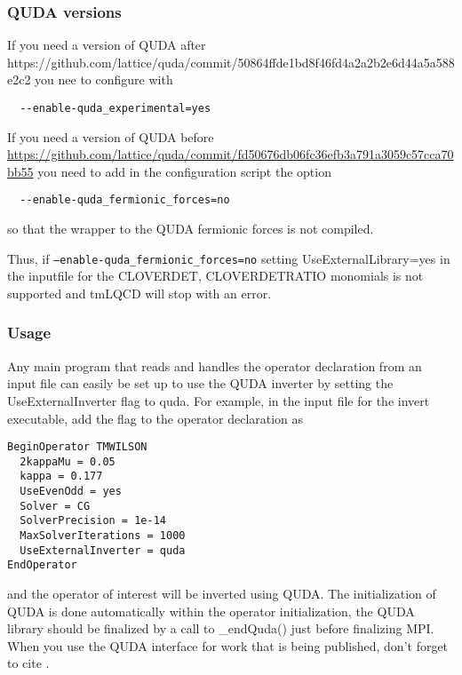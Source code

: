 \subsubsection{QUDA versions}

If you need a version of QUDA after https://github.com/lattice/quda/commit/50864ffde1bd8f46fd4a2a2b2e6d44a5a588e2c2 you nee to configure with 
\begin{verbatim}
  --enable-quda_experimental=yes
\end{verbatim}

If you need a version of QUDA before \url{https://github.com/lattice/quda/commit/fd50676db06fc36efb3a791a3059c57cca70bb55} you need to add in the configuration script the option
\begin{verbatim}
  --enable-quda_fermionic_forces=no
\end{verbatim}
so that the wrapper to the QUDA fermionic forces is not compiled.

Thus, if \texttt{--enable-quda\_fermionic\_forces=no} setting {\ttfamily UseExternalLibrary=yes} in the inputfile for the {\ttfamily  CLOVERDET, CLOVERDETRATIO} monomials
is not supported and tmLQCD will stop with an error.


\subsubsection{Usage}
Any main program that reads and handles the operator declaration from an input file can easily be set up to use the QUDA inverter by setting the {\ttfamily UseExternalInverter} flag to {\ttfamily quda}. For example, in the input file for the {\ttfamily invert} executable, add the flag to the operator declaration as
\begin{verbatim}
BeginOperator TMWILSON
  2kappaMu = 0.05
  kappa = 0.177
  UseEvenOdd = yes
  Solver = CG
  SolverPrecision = 1e-14
  MaxSolverIterations = 1000
  UseExternalInverter = quda
EndOperator
\end{verbatim}
and the operator of interest will be inverted using QUDA. The initialization of QUDA is done automatically within the operator initialization,  the QUDA library should be finalized by a call to {\ttfamily \_endQuda()} just before finalizing MPI. When you use the QUDA interface for work that is being published, don't forget to cite \cite{Clark:2009wm, Babich:2011np, Strelchenko:2013vaa}.

